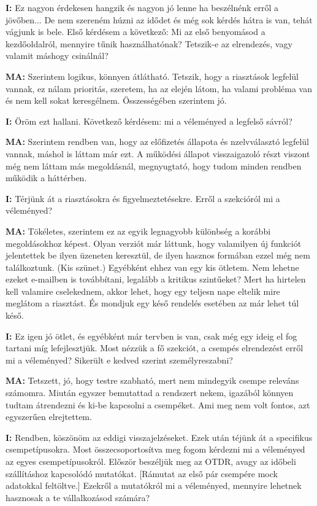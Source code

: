 \documentclass{imc-inf}
\begin{document}
\begin{appendices}
  \noindent\textbf{I:} Ez nagyon érdekesen hangzik és nagyon jó lenne ha beszélnénk erről a jövőben... De nem szereném húzni az idődet és még sok kérdés hátra is van, tehát vágjunk is bele. Első kérdésem a következő: Mi az első benyomásod a kezdőoldalról, mennyire tűnik használhatónak? Tetszik-e az elrendezés, vagy valamit máshogy csinálnál?

  \noindent\textbf{MA:} Szerintem logikus, könnyen átlátható. Tetszik, hogy a riasztások legfelül vannak, ez nálam prioritás, szeretem, ha az elején látom, ha valami probléma van és nem kell sokat keresgélnem. Összességében szerintem jó.

  \noindent\textbf{I:} Öröm ezt hallani. Következő kérdésem: mi a véleményed a legfelső sávról?

  \noindent\textbf{MA:} Szerintem rendben van, hogy az előfizetés állapota és nzelvválasztó legfelül vannak, máshol is láttam már ezt. A működési állapot visszaigazoló részt viszont még nem láttam más megoldásnál, megnyugtató, hogy tudom minden rendben működik a háttérben.

  \noindent\textbf{I:} Térjünk át a riasztásokra és figyelmeztetésekre. Erről a szekcióról mi a véleményed?

  \noindent\textbf{MA:} Tökéletes, szerintem ez az egyik legnagyobb különbség a korábbi megoldásokhoz képest. Olyan verziót már láttunk, hogy valamilyen új funkciót jelentettek be ilyen üzeneten keresztül, de ilyen hasznos formában ezzel még nem találkoztunk. (Kis szünet.) Egyébként ehhez van egy kis ötletem. Nem lehetne ezeket e-mailben is továbbítani, legalább a kritikus szintűeket? Mert ha hirtelen kell valamire cselekednem, akkor lehet, hogy egy teljesn nape eltelik mire meglátom a riasztást. És mondjuk egy késő rendelés esetében az már lehet túl késő.

  \noindent\textbf{I:} Ez igen jó ötlet, és egyébként már tervben is van, csak még egy ideig el fog tartani míg lefejlesztjük. Most nézzük a fő szekciót, a csempés elrendezést erről mi a véleményed? Sikerült e kedved szerint személyreszabni?

  \noindent\textbf{MA:} Tetszett, jó, hogy testre szabható, mert nem mindegyik csempe releváns számomra. Miután egyszer bemutattad a rendszert nekem, igazából könnyen tudtam átrendezni és ki-be kapcsolni a csempéket. Ami meg nem volt fontos, azt egyszerűen elrejtettem.

  \noindent\textbf{I:} Rendben, köszönöm az eddigi visszajelzéseket. Ezek után téjünk át a specifikus csempetípusokra. Most összecsoportosítva meg fogom kérdezni mi a véleményed az egyes csempetípusokról. Először beszéljük meg az OTDR, avagy az időbeli szállításhoz kapcsolódó mutatókat. [Rámutat az első pár csempére mock adatokkal feltöltve.] Ezekről a mutatókról mi a véleményed, mennyire lehetnek hasznosak a te vállalkozásod számára?


\end{appendices}
\end{document}
